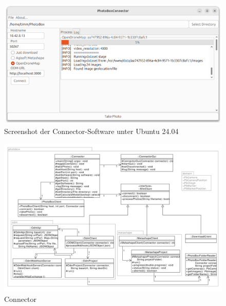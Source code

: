 \documentclass[./00PhotoBox.tex]{subfiles}
\begin{document}
\begin{figure}
    \centering
    \includegraphics[width=1\textwidth]{./img/connector_screenshot.png}
    \centering
    \caption{Screenshot der Connector-Software unter Ubuntu 24.04} %
    \label{img:screenshot_connector} %
\end{figure}

\begin{figure}
    \centering
    \includegraphics[width=1\textwidth]{./img/uml/uml_connector_classdiagramm.pdf}
    \centering
    \caption{Connector} %
    \label{img:uml_connector} %
\end{figure}

\biblio
\end{document}
